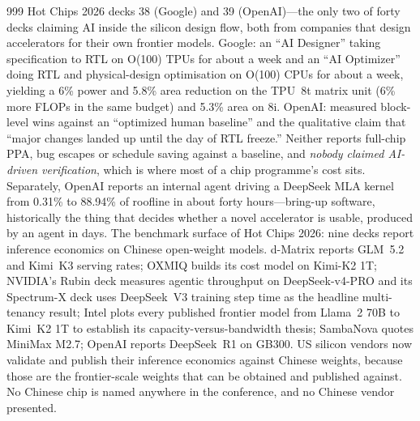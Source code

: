\begin{thebibliography}{999}
 Hot Chips 2026 decks 38 (Google) and 39 (OpenAI)---the only two of forty decks claiming AI inside the silicon design flow, both from companies that design accelerators for their own frontier models. Google: an ``AI Designer'' taking specification to RTL on O(100) TPUs for about a week and an ``AI Optimizer'' doing RTL and physical-design optimisation on O(100) CPUs for about a week, yielding a 6\% power and 5.8\% area reduction on the TPU~8t matrix unit (6\% more FLOPs in the same budget) and 5.3\% area on 8i. OpenAI: measured block-level wins against an ``optimized human baseline'' and the qualitative claim that ``major changes landed up until the day of RTL freeze.'' Neither reports full-chip PPA, bug escapes or schedule saving against a baseline, and \emph{nobody claimed AI-driven verification}, which is where most of a chip programme's cost sits. Separately, OpenAI reports an internal agent driving a DeepSeek MLA kernel from 0.31\% to 88.94\% of roofline in about forty hours---bring-up software, historically the thing that decides whether a novel accelerator is usable, produced by an agent in days.
 The benchmark surface of Hot Chips 2026: nine decks report inference economics on Chinese open-weight models. d-Matrix reports GLM~5.2 and Kimi~K3 serving rates; OXMIQ builds its cost model on Kimi-K2 1T; NVIDIA's Rubin deck measures agentic throughput on DeepSeek-v4-PRO and its Spectrum-X deck uses DeepSeek~V3 training step time as the headline multi-tenancy result; Intel plots every published frontier model from Llama~2 70B to Kimi~K2 1T to establish its capacity-versus-bandwidth thesis; SambaNova quotes MiniMax M2.7; OpenAI reports DeepSeek~R1 on GB300. US silicon vendors now validate and publish their inference economics against Chinese weights, because those are the frontier-scale weights that can be obtained and published against. No Chinese chip is named anywhere in the conference, and no Chinese vendor presented.


\end{thebibliography}
